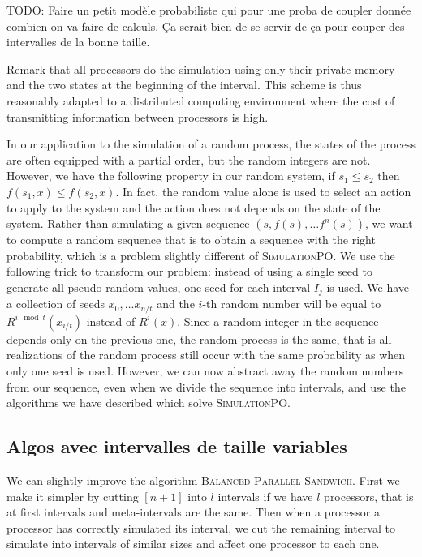 \documentclass[a4paper,10pt]{article}
\newcommand{\todo}[1]{{\color{red} TODO: {#1}}}
\begin{document}
 \todo{Faire un petit modèle probabiliste qui pour une proba de coupler donnée combien on va faire de calculs.
 Ça serait bien de se servir de ça pour couper des intervalles de la bonne taille. }
 
Remark that all processors do the simulation using only their private memory and the two states at the beginning of the interval. This scheme is thus reasonably adapted to a distributed computing environment where the cost of transmitting information between processors is high. 

In our application to the simulation of a random process, the states of the process 
are often equipped with a partial order, but the random integers are not. 
However, we have the following property in our random system, if $s_1 \leq s_2$ then $f(s_1,x) \leq f(s_2,x)$. 
In fact, the random value alone is used to select an action to apply to the system and the action does not depends on the state of the system. Rather than simulating a given sequence $(s,f(s),\dots f^n(s))$, we want to compute a random sequence
that is to obtain a sequence with the right probability, which is a problem slightly different of \textsc{SimulationPO}.
We use the following trick to transform our problem: instead of using a single seed to generate all pseudo random values, one seed for each interval $I_j$ is used. We have a collection of seeds $x_0, \dots x_{n/t}$ and the $i$-th random number will be equal to $R^{i \mod t}(x_{i/t})$ instead of $R^i(x)$.
Since a random integer in the sequence depends only on the previous one, the random process is the same, that is  all realizations of the random process still occur with the same probability as when only one seed is used.
However, we can now abstract away the random numbers from our sequence, even when we divide the sequence into intervals, 
and use the algorithms we have described which solve \textsc{SimulationPO}.

\subsection{Algos avec intervalles de taille variables}


We can slightly improve the algorithm \textsc{Balanced Parallel Sandwich}.
First we make it simpler by cutting $[n+1]$ into $l$ intervals if we have $l$
processors, that is at first intervals and meta-intervals are the same. Then when a processor
a processor has correctly simulated its interval, we cut the remaining interval to simulate into 
intervals of similar sizes and affect one processor to each one.
\end{document}

